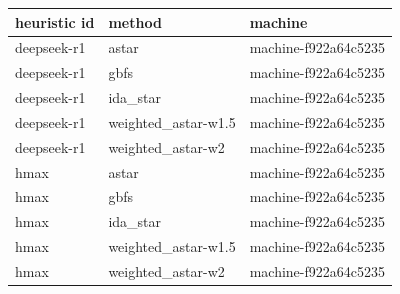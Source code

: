 \begin{longtable}{>{\raggedright\arraybackslash}p{}>{\raggedright\arraybackslash}p{}>{\raggedright\arraybackslash}p{}}
\hline
heuristic id & method & machine \\ \hline\endhead
deepseek-r1 & astar & machine-f922a64c5235 \\
deepseek-r1 & gbfs & machine-f922a64c5235 \\
deepseek-r1 & ida\_\allowbreak{}star & machine-f922a64c5235 \\
deepseek-r1 & weighted\_\allowbreak{}astar-w1.5 & machine-f922a64c5235 \\
deepseek-r1 & weighted\_\allowbreak{}astar-w2 & machine-f922a64c5235 \\
hmax & astar & machine-f922a64c5235 \\
hmax & gbfs & machine-f922a64c5235 \\
hmax & ida\_\allowbreak{}star & machine-f922a64c5235 \\
hmax & weighted\_\allowbreak{}astar-w1.5 & machine-f922a64c5235 \\
hmax & weighted\_\allowbreak{}astar-w2 & machine-f922a64c5235 \\
\hline
\end{longtable}
\endgroup
